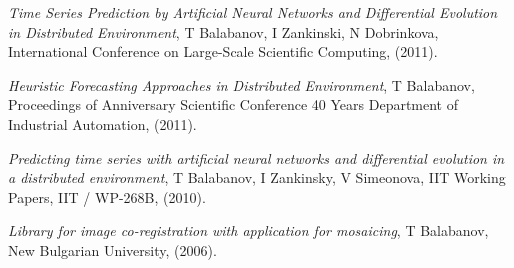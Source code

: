 \documentclass[english,a4paper]{europasscv}
\begin{document}
\begin{europasscv}
{\begin{ecvitemize}
    \item \textit{Time Series Prediction by Artificial Neural Networks and Differential Evolution in Distributed Environment}, T Balabanov, I Zankinski, N Dobrinkova, International Conference on Large-Scale Scientific Computing, (2011).
    \item \textit{Heuristic Forecasting Approaches in Distributed Environment}, T Balabanov, Proceedings of Anniversary Scientific Conference 40 Years Department of Industrial Automation, (2011).
    \item \textit{Predicting time series with artificial neural networks and differential evolution in a distributed environment}, T Balabanov, I Zankinsky, V Simeonova, IIT Working Papers, IIT / WP-268B, (2010).
    \item \textit{Library for image co-registration with application for mosaicing}, T Balabanov, New Bulgarian University, (2006).
  \end{ecvitemize}}
  
  \end{europasscv}
\end{document}

